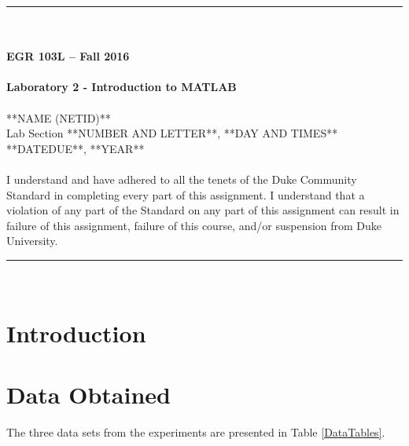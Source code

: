 \documentclass{article}
\begin{document}
\begin{center}
\rule{6.5in}{0.5mm}\\~\\
{\bf \large EGR 103L -- Fall 2016}\\~\\
{\huge \bf Laboratory 2 - Introduction to MATLAB}\\~\\
**NAME (NETID)**\\
Lab Section **NUMBER AND LETTER**, **DAY AND TIMES**\\
**DATEDUE**, **YEAR**\\~\\
{\small I understand and have adhered to all the tenets of the Duke
  Community Standard in completing every part of this assignment.  I
  understand that a violation of any part of the Standard on any part
  of this assignment can result in failure of this assignment, failure
  of this course, and/or suspension from Duke University.} 
\rule{6.5in}{0.5mm}\\
\end{center}
\tableofcontents
\listoffigures
\pagebreak

\section{Introduction}

\section{Data Obtained}
The three data sets from the experiments are presented in Table
\ref{DataTables}.
\end{document}
